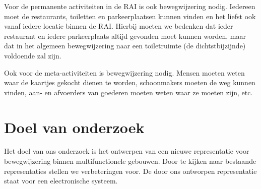 Voor de permanente activiteiten in de RAI is ook bewegwijzering nodig. Iedereen moet de restaurants, toiletten en parkeerplaatsen kunnen vinden en het liefst ook vanaf iedere locatie binnen de RAI. Hierbij moeten we bedenken dat ieder restaurant en iedere parkeerplaats altijd gevonden moet kunnen worden, maar dat in het algemeen bewegwijzering naar een toiletruimte (de dichtstbijzijnde) voldoende zal zijn.

Ook voor de meta-activiteiten is bewegwijzering nodig. Mensen moeten weten waar de kaartjes gekocht dienen te worden, schoonmakers moeten de weg kunnen vinden, aan- en afvoerders van goederen moeten weten waar ze moeten zijn, etc.


\section{Doel van onderzoek}

Het doel van ons onderzoek is het ontwerpen van een nieuwe representatie voor bewegwijzering binnen multifunctionele gebouwen. Door te kijken naar bestaande representaties stellen we verbeteringen voor. De door ons ontworpen representatie staat voor een electronische systeem.
